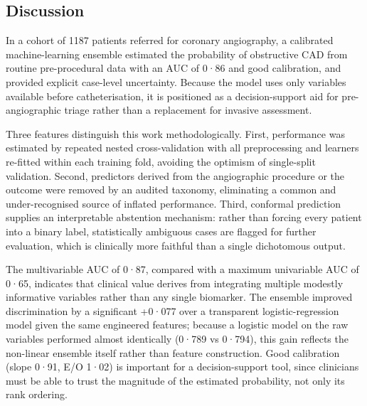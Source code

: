 \documentclass[
  english,
  11pt,
]{article}
\begin{document}
\subsection{Discussion}\label{discussion}

In a cohort of 1187 patients referred for coronary angiography, a
calibrated machine-learning ensemble estimated the probability of
obstructive CAD from routine pre-procedural data with an AUC of 0·86 and
good calibration, and provided explicit case-level uncertainty. Because
the model uses only variables available before catheterisation, it is
positioned as a decision-support aid for pre-angiographic triage rather
than a replacement for invasive assessment.

Three features distinguish this work methodologically. First,
performance was estimated by repeated nested cross-validation with all
preprocessing and learners re-fitted within each training fold, avoiding
the optimism of single-split validation. Second, predictors derived from
the angiographic procedure or the outcome were removed by an audited
taxonomy, eliminating a common and under-recognised source of inflated
performance. Third, conformal prediction supplies an interpretable
abstention mechanism: rather than forcing every patient into a binary
label, statistically ambiguous cases are flagged for further evaluation,
which is clinically more faithful than a single dichotomous output.

The multivariable AUC of 0·87, compared with a maximum univariable AUC
of 0·65, indicates that clinical value derives from integrating multiple
modestly informative variables rather than any single biomarker. The
ensemble improved discrimination by a significant +0·077 over a
transparent logistic-regression model given the same engineered
features; because a logistic model on the raw variables performed almost
identically (0·789 vs 0·794), this gain reflects the non-linear ensemble
itself rather than feature construction. Good calibration (slope 0·91,
E/O 1·02) is important for a decision-support tool, since clinicians
must be able to trust the magnitude of the estimated probability, not
only its rank ordering.
\end{document}
